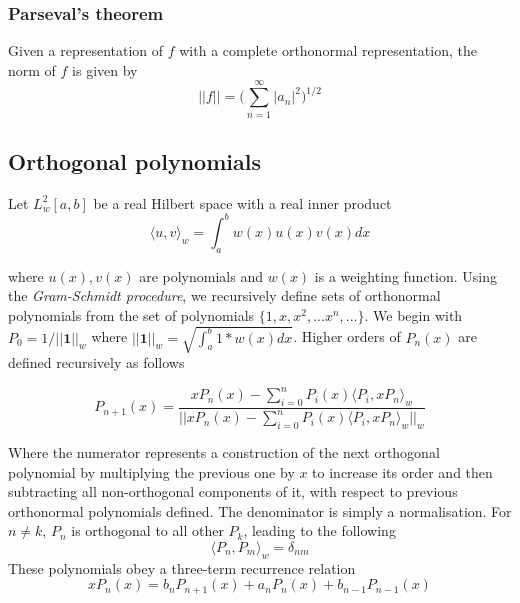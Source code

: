 \documentclass[]{article}
\begin{document}
\subsubsection{Parseval's theorem}
Given a representation of $f$ with a complete orthonormal representation, the norm of $f$ is given by
\begin{equation} ||f|| = \big (\sum_{n=1}^{\infty} |a_{n}|^{2} \big )^{1/2} \end{equation}
\subsection{Orthogonal polynomials}
Let $L_{w}^{2}[a,b]$ be a real Hilbert space with a real inner product
\begin{equation} \langle u,v \rangle_{w} = \int_{a}^{b} w(x)u(x)v(x)dx  \end{equation}

where $u(x), v(x)$ are polynomials and $w(x)$ is a weighting function.
\newline
\newline
Using the \textit{Gram-Schmidt procedure}, we recursively define sets of orthonormal polynomials from the set of polynomials $\{ 1, x, x^{2},...x^{n},... \}$. We begin with $P_{0}=1/||\textbf{1}||_{w}$ where $||\textbf{1}||_{w} = \sqrt{\int_{a}^{b} 1*w(x) dx}$. Higher orders of $P_{n}(x)$ are defined recursively as follows

\begin{equation} P_{n+1}(x) = \frac{x P_{n}(x)- \sum_{i=0}^{n}P_{i}(x)\langle P_{i}, xP_{n} \rangle_{w}}{||x P_{n}(x)- \sum_{i=0}^{n}P_{i}(x)\langle P_{i}, xP_{n} \rangle_{w}||_{w}} \end{equation}

Where the numerator represents a construction of the next orthogonal polynomial by multiplying the previous one by $x$ to increase its order and then subtracting all non-orthogonal components of it, with respect to previous orthonormal polynomials defined. The denominator is simply a normalisation.
\newline
\newline
For $n \neq k$, $P_{n}$ is orthogonal to all other $P_{k}$, leading to the following 
\begin{equation} \langle P_{n}, P_{m} \rangle_{w} = \delta_{nm} \end{equation}
These polynomials obey a three-term recurrence relation
\begin{equation} xP_{n}(x) = b_{n}P_{n+1}(x) + a_{n}P_{n}(x) + b_{n-1}P_{n-1}(x) \end{equation} 
\end{document}
